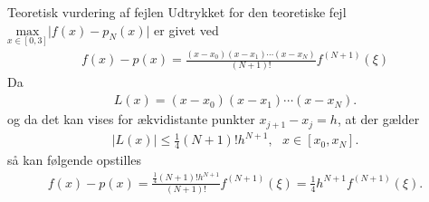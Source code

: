 
\begin{frame}{Teoretisk vurdering af fejlen}
    Udtrykket for den teoretiske fejl $\underset{x \in \left [0,3 \right ]}{\text{max}} \lvert f(x)-p_N(x) \rvert$ er givet ved 
\begin{align*}
f(x)-p(x) = \frac{(x-x_0)(x-x_1)\cdots(x-x_N)}{(N+1)!}f^{(N+1)}(\xi)
\end{align*}
Da 
\begin{align*}
    L(x)=(x-x_0)(x-x_1)\cdots(x-x_N).
\end{align*}
og da det kan vises for ækvidistante punkter $x_{j+1} - x_j = h$, at der gælder
    \begin{align*}
    \lvert L(x) \rvert \leq \frac{1}{4}(N+1)!h^{N+1}, \text{   } x \in \left [x_0, x_N \right ].
    \end{align*}
så kan følgende opstilles 
\begin{align*}
f(x)-p(x) = \frac{\frac{1}{4}(N+1)!h^{N+1}}{(N+1)!}f^{(N+1)}(\xi)=\frac{1}{4}h^{N+1}f^{(N+1)}(\xi).
\end{align*}
\end{frame}